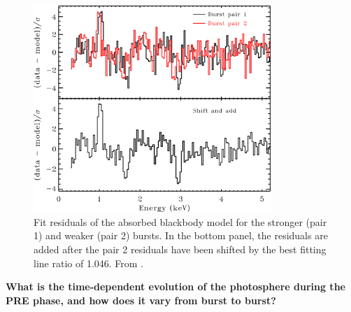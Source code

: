 \documentclass[../main.tex]{subfiles}
\begin{document}

\begin{figure}[htb!]
    \centering
    \includegraphics[width=0.8\textwidth]{figures/Strohmayer2019_residuals.jpg}
    \caption[Burst spectra fit residuals showing spectral lines]{Fit residuals of the absorbed blackbody model for the stronger (pair 1) and weaker (pair 2) bursts. In the bottom panel, the residuals are added after the pair 2 residuals have been shifted by the best fitting line ratio of 1.046. From \citet{Strohmayer2019}.}
    \label{fig:strohmayer_burstpair_residuals}
\end{figure}

\noindent\textbf{What is the time-dependent evolution of the photosphere during the PRE phase, and how does it vary from burst to burst?} 
\end{document}
